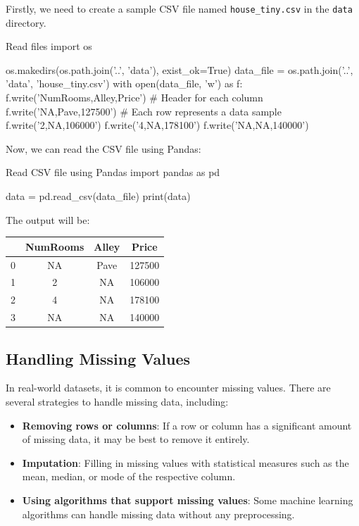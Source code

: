 Firstly, we need to create a sample CSV file named \texttt{house\_tiny.csv} in the \texttt{data} directory.

\begin{pythoncode}{Read files}
import os

os.makedirs(os.path.join('..', 'data'), exist_ok=True)
data_file = os.path.join('..', 'data', 'house_tiny.csv')
with open(data_file, 'w') as f:
    f.write('NumRooms,Alley,Price\n')  # Header for each column
    f.write('NA,Pave,127500\n')        # Each row represents a data sample
    f.write('2,NA,106000\n')
    f.write('4,NA,178100\n')
    f.write('NA,NA,140000\n')
\end{pythoncode}

Now, we can read the CSV file using Pandas:

\begin{pythoncode}{Read CSV file using Pandas}
import pandas as pd

data = pd.read_csv(data_file)
print(data)
\end{pythoncode}

The output will be:
\begin{center}
    \begin{tabular}{cccc}
    \hline
    & NumRooms & Alley & Price \\
    \hline
    0 & NA & Pave & 127500 \\
    1 & 2 & NA & 106000 \\
    2 & 4 & NA & 178100 \\
    3 & NA & NA & 140000 \\
    \hline
    \end{tabular}
\end{center}

\subsection{Handling Missing Values}

In real-world datasets, it is common to encounter missing values. There are several strategies to handle missing data, including:
\begin{itemize}
    \item \textbf{Removing rows or columns}: If a row or column has a significant amount of missing data, it may be best to remove it entirely.
    \item \textbf{Imputation}: Filling in missing values with statistical measures such as the mean, median, or mode of the respective column.
    \item \textbf{Using algorithms that support missing values}: Some machine learning algorithms can handle missing data without any preprocessing.
\end{itemize}

